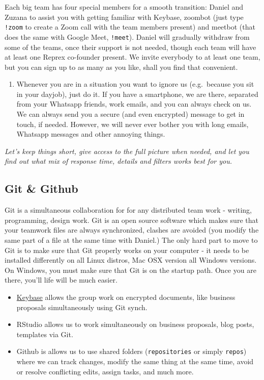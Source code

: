 \documentclass[
  fontsize=13pt,
  english,
  a4paper,
  openany, a4paper, oneside]{book}
\providecommand{\tightlist}{%
  \setlength{\itemsep}{0pt}\setlength{\parskip}{0pt}}
\begin{document}
Each big team has four special members for a smooth transition: Daniel and Zuzana to assist you with getting familiar with Keybase, zoombot (just type \texttt{!zoom} to create a Zoom call with the team members present) and meetbot (that does the same with Google Meet, \texttt{!meet}). Daniel will gradually withdraw from some of the teams, once their support is not needed, though each team will have at least one Reprex co-founder present. We invite everybody to at least one team, but you can sign up to as many as you like, shall you find that convenient.

\begin{enumerate}
\def\labelenumi{\arabic{enumi}.}
\setcounter{enumi}{8}
\tightlist
\item
  Whenever you are in a situation you want to ignore us (e.g.~because you sit in your dayjob), just do it. If you have a smartphone, we are there, separated from your Whatsapp friends, work emails, and you can always check on us. We can always send you a secure (and even encrypted) message to get in touch, if needed. However, we will never ever bother you with long emails, Whatsapp messages and other annoying things.
\end{enumerate}

\emph{Let's keep things short, give access to the full picture when needed, and let you find out what mix of response time, details and filters works best for you.}

\hypertarget{github}{%
\subsection{Git \& Github}\label{github}}

Git is a simultaneous collaboration for for any distributed team work - writing, programming, design work. Git is an open source software which makes sure that your teamwork files are always synchronized, clashes are avoided (you modify the same part of a file at the same time with Daniel.) The only hard part to move to Git is to make sure that Git properly works on your computer - it needs to be installed differently on all Linux distros, Mac OSX version all Windows versions. On Windows, you must make sure that Git is on the startup path. Once you are there, you'll life will be much easier.

\begin{itemize}
\item
  \protect\hyperlink{keybase}{Keybase} allows the group work on encrypted documents, like business proposals simultaneously using Git synch.
\item
  RStudio allows us to work simultaneously on business proposals, blog posts, templates via Git.
\item
  Github is allows us to use shared folders (\texttt{repositories} or simply \texttt{repos}) where we can track changes, modify the same thing at the same time, avoid or resolve conflicting edits, assign tasks, and much more.
\end{itemize}
\end{document}
